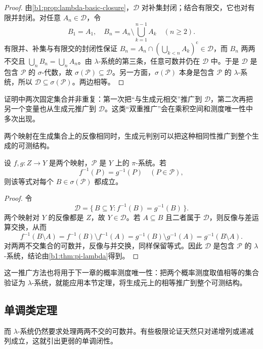 \begin{proof}
由\cref{b1:prop:lambda-basic-closure}，\(\mathcal D\) 对补集封闭；结合有限交，它也对有限并封闭。对任意 \(A_n\in\mathcal D\)，令
\[
B_1=A_1,
\quad
B_n=A_n\setminus\bigcup_{k=1}^{n-1}A_k\quad(n\geq2).
\]
有限并、补集与有限交的封闭性保证
\(
B_n=A_n\cap\left(\bigcup_{k<n}A_k\right)^{\mathrm c}\in\mathcal D
\)，而 \(B_n\) 两两不交且 \(\bigcup_nB_n=\bigcup_nA_n\)。由 \(\lambda\)-系统的第三条，任意可数并仍在 \(\mathcal D\) 中。于是 \(\mathcal D\) 是包含 \(\mathcal P\) 的 \(\sigma\)-代数，故
\(
\sigma(\mathcal P)\subseteq\mathcal D
\)。另一方面，\(\sigma(\mathcal P)\) 本身是包含 \(\mathcal P\) 的 \(\lambda\)-系统，所以 \(\mathcal D\subseteq\sigma(\mathcal P)\)。两边相等。
\end{proof}

证明中两次固定集合并非重复：第一次把“与生成元相交”推广到 \(\mathcal D\)，第二次再把另一个变量也从生成元推广到 \(\mathcal D\)。这类“双重推广”会在乘积空间和测度唯一性中多次出现。

\ProseParagraphBreak

两个映射在生成集合上的反像相同时，生成元判别可以把这种相同性推广到整个生成的可测结构。

\begin{corollary}
\label{b1:cor:inverse-images-agree}
设 \(f,g:Z\to Y\) 是两个映射，\(\mathcal P\) 是 \(Y\) 上的 \(\pi\)-系统。若
\[
f^{-1}(P)=g^{-1}(P)
\quad(P\in\mathcal P),
\]
则该等式对每个 \(B\in\sigma(\mathcal P)\) 都成立。
\end{corollary}
\begin{proof}
令
\[
\mathcal D
=\{\,B\subseteq Y:f^{-1}(B)=g^{-1}(B)\,\}.
\]
两个映射对 \(Y\) 的反像都是 \(Z\)，故 \(Y\in\mathcal D\)。若 \(A\subseteq B\) 且二者属于 \(\mathcal D\)，则反像与差运算交换，从而
\[
f^{-1}(B\setminus A)
=f^{-1}(B)\setminus f^{-1}(A)
=g^{-1}(B)\setminus g^{-1}(A)
=g^{-1}(B\setminus A).
\]
对两两不交集合的可数并，反像与并交换，同样保留等式。因此 \(\mathcal D\) 是包含 \(\mathcal P\) 的 \(\lambda\)-系统，结论由\cref{b1:thm:pi-lambda}得到。
\end{proof}

这一推广方法也将用于下一章的概率测度唯一性：把两个概率测度取值相等的集合验证为 \(\lambda\)-系统，就能应用本节定理，将生成元上的相等推广到整个可测结构。

\subsection{单调类定理}
\label{b1:subsec:010304}

而 \(\lambda\)-系统仍然要求处理两两不交的可数并。有些极限论证天然只对递增列或递减列成立，这就引出更弱的单调闭性。

